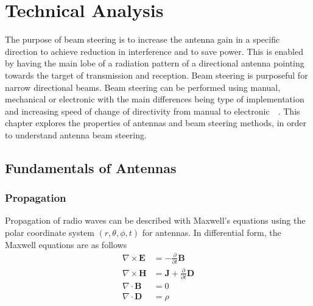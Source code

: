 \chapter{Technical Analysis}
The purpose of beam steering is to increase the antenna gain in a specific direction to achieve reduction in interference and to save power. This is enabled by having the main lobe of a radiation pattern of a directional antenna pointing towards the target of transmission and reception. Beam steering is purposeful for narrow directional beams. Beam steering can be performed using manual, mechanical or electronic with the main differences being type of implementation and increasing speed of change of directivity from manual to electronic~\cite{ieee_beam_steering}~\cite{ieee_microchip_beam_steering}. This chapter explores the properties of antennas and beam steering methods, in order to understand antenna beam steering.

\section{Fundamentals of Antennas}

\subsection{Propagation}
Propagation of radio waves can be described with Maxwell's equations using the polar coordinate system $\left( r, \theta, \phi, t \right)$ for antennas. In differential form, the Maxwell equations are as follows
\begin{equation}
    \begin{split}
        \nabla \times \textbf{E} & = - \frac{\partial }{\partial t} \textbf{B} \\
        \nabla \times \textbf{H} & = \textbf{J} + \frac{\partial }{\partial t} \textbf{D} \\
        \nabla \cdot \textbf{B} & = 0 \\
        \nabla \cdot \textbf{D} & = \rho
    \end{split}
\end{equation}

